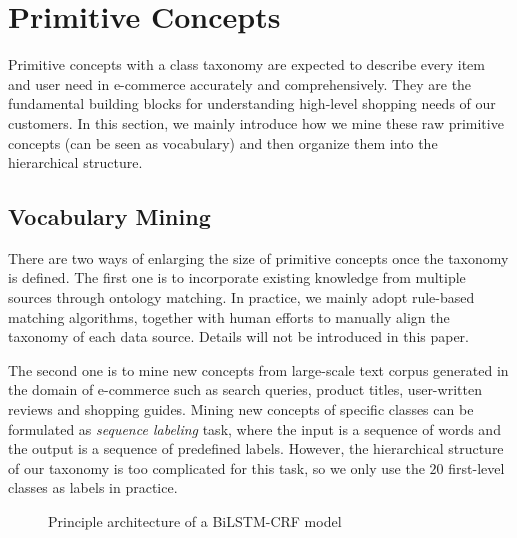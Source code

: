 

\section{Primitive Concepts}
\label{sec:primitive}
Primitive concepts with a class taxonomy are expected to describe every item and user need in e-commerce accurately and comprehensively.
They are the fundamental building blocks for understanding high-level shopping needs of our customers.
In this section, we mainly introduce how we mine these raw primitive concepts (can be seen as vocabulary) and then organize them into the hierarchical structure.


\subsection{Vocabulary Mining}
\label{sec:mining}
There are two ways of enlarging the size of primitive concepts once the taxonomy is defined.
The first one is to incorporate existing knowledge from multiple sources through ontology matching.
In practice, we mainly adopt rule-based matching algorithms, together with human efforts to manually align the taxonomy of each data source. Details will not be introduced in this paper.

The second one is to mine new concepts from large-scale text corpus generated in the domain of e-commerce such as search queries, product titles, user-written reviews and shopping guides.
Mining new concepts of specific classes can be formulated as \textit{sequence labeling} task,
where the input is a sequence of words and the output is a sequence of predefined labels.
However, the hierarchical structure of our taxonomy is too complicated for this task, 
so we only use the $20$ first-level classes as labels in practice.

\begin{figure}[th]
	\centering
	\caption{Principle architecture of a BiLSTM-CRF model
	}
	\label{fig:bilstm_crf}
\end{figure}


